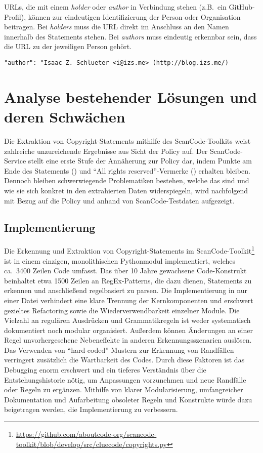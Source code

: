 URLs, die mit einem \textit{holder} oder \textit{author} in Verbindung stehen (z.B.\ ein GitHub-Profil), können zur eindeutigen Identifizierung der Person oder Organisation beitragen.
Bei \textit{holders} muss die URL direkt im Anschluss an den Namen innerhalb des Statements stehen.
Bei \textit{authors} muss eindeutig erkennbar sein, dass die URL zu der jeweiligen Person gehört.

\begin{lstlisting}[keepspaces=true]
"author": "Isaac Z. Schlueter <i@izs.me> (http://blog.izs.me/)
\end{lstlisting}


\section{Analyse bestehender Lösungen und deren Schwächen}\label{sec:analyse-bestehender-losungen}

Die Extraktion von Copyright-Statements mithilfe des ScanCode-Toolkits weist zahlreiche unzureichende Ergebnisse aus Sicht der Policy auf.
Der ScanCode-Service stellt eine erste Stufe der Annäherung zur Policy dar, indem Punkte am Ende des Statements () und \enquote{All rights reserved}-Vermerke () erhalten bleiben.
Dennoch bleiben schwerwiegende Problematiken bestehen, welche das sind und wie sie sich konkret in den extrahierten Daten widerspiegeln, wird nachfolgend mit Bezug auf die Policy und anhand von ScanCode-Testdaten aufgezeigt.

\subsection{Implementierung}

Die Erkennung und Extraktion von Copyright-Statements im ScanCode-Toolkit\footnote{\url{https://github.com/aboutcode-org/scancode-toolkit/blob/develop/src/cluecode/copyrights.py}} ist in einem einzigen, monolithischen Pythonmodul implementiert, welches ca.\ \num{3400} Zeilen Code umfasst.
Das über \num{10} Jahre gewachsene Code-Konstrukt beinhaltet etwa \num{1500} Zeilen an RegEx-Patterns, die dazu dienen, Statements zu erkennen und anschließend regelbasiert zu parsen.
Die Implementierung in nur einer Datei verhindert eine klare Trennung der Kernkomponenten und erschwert gezieltes Refactoring sowie die Wiederverwendbarkeit einzelner Module.
Die Vielzahl an regulären Ausdrücken und Grammatikregeln ist weder systematisch dokumentiert noch modular organisiert.
Außerdem können Änderungen an einer Regel unvorhergesehene Nebeneffekte in anderen Erkennungsszenarien auslösen.
Das Verwenden von \enquote{hard-coded} Mustern zur Erkennung von Randfällen verringert zusätzlich die Wartbarkeit des Codes.
Durch diese Faktoren ist das Debugging enorm erschwert und ein tieferes Verständnis über die Entstehungshistorie nötig, um Anpassungen vorzunehmen und neue Randfälle oder Regeln zu ergänzen.
Mithilfe von klarer Modularisierung, umfangreicher Dokumentation und Aufarbeitung obsoleter Regeln und Konstrukte würde dazu beigetragen werden, die Implementierung zu verbessern.

